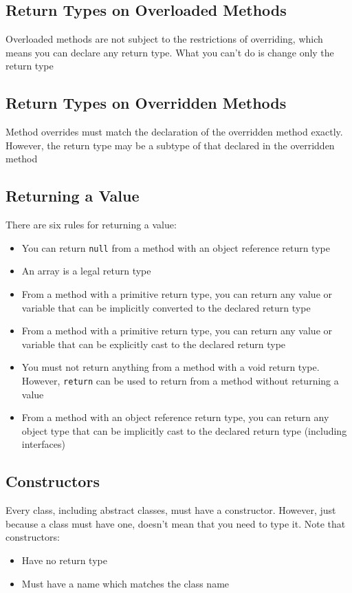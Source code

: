 \subsection{Return Types on Overloaded Methods}
Overloaded methods are not subject to the restrictions of overriding, which 
means you can declare any return type. What you can't do is change only the 
return type

\subsection{Return Types on Overridden Methods}
Method overrides must match the declaration of the overridden method exactly.  
However, the return type may be a subtype of that declared in the overridden 
method

\subsection{Returning a Value}
There are six rules for returning a value:
\begin{itemize}
    \item You can return \verb#null# from a method with an object reference 
    return type
    \item An array is a legal return type
    \item From a method with a primitive return type, you can return any value 
    or variable that can be implicitly converted to the declared return type
    \item From a method with a primitive return type, you can return any value 
    or variable that can be explicitly cast to the declared return type
    \item You must not return anything from a method with a void return type.  
    However, \verb#return# can be used to return from a method without 
    returning a value
    \item From a method with an object reference return type, you can return 
    any object type that can be implicitly cast to the declared return type 
    (including interfaces)
\end{itemize}

\subsection{Constructors}
Every class, including abstract classes, must have a constructor. However, just 
because a class must have one, doesn't mean that you need to type it. Note that 
constructors:
\begin{itemize}
    \item Have no return type
    \item Must have a name which matches the class name
\end{itemize}

